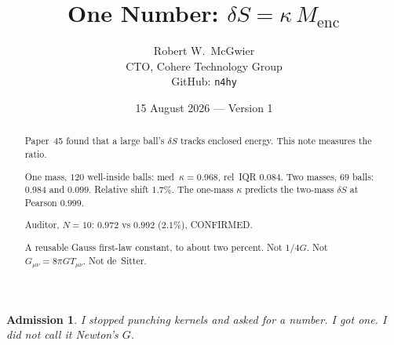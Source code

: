 \documentclass[11pt]{article}
\title{\textbf{One Number: $\delta S=\kappa\,M_{\mathrm{enc}}$}}
\author{Robert W.\ McGwier\\
\small CTO, Cohere Technology Group\\
\small GitHub: \texttt{n4hy}}
\date{15 August 2026 --- Version 1}
\newtheorem*{admission}{Admission}
\begin{document}
\maketitle

\begin{abstract}
\noindent
Paper~45 found that a large ball's $\delta S$ tracks
enclosed energy. This note measures the ratio.

One mass, $120$ well-inside balls: med~$\kappa=0.968$,
rel~IQR $0.084$. Two masses, $69$ balls: $0.984$ and
$0.099$. Relative shift $1.7\%$. The one-mass $\kappa$
predicts the two-mass $\delta S$ at Pearson $0.999$.

Auditor, $N=10$: $0.972$ vs $0.992$ ($2.1\%$), CONFIRMED.

A reusable Gauss first-law constant, to about two percent.
Not $1/4G$. Not $G_{\mu\nu}=8\pi GT_{\mu\nu}$. Not de~Sitter.
\end{abstract}

\begin{admission}
I stopped punching kernels and asked for a number. I got
one. I did not call it Newton's $G$.
\end{admission}
\end{document}
